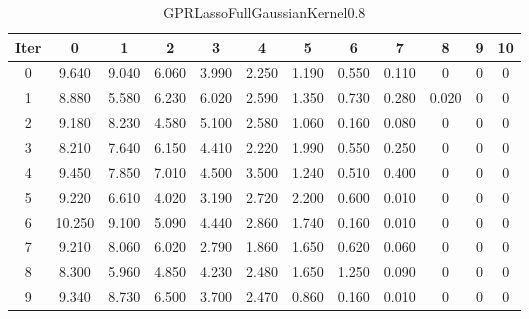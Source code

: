 \begin{table}
	\begin{center}
		\begin{tabular}{|c|c|c|c|c|c|c|c|c|c|c|c|}
			\hline
			Iter & 0 & 1 & 2 & 3 & 4 & 5 & 6 & 7 & 8 & 9 & 10 \\
			\hline
			0 & 9.640 & 9.040 & 6.060 & 3.990 & 2.250 & 1.190 & 0.550 & 0.110 & 0 & 0 & 0 \\
			\hline
			1 & 8.880 & 5.580 & 6.230 & 6.020 & 2.590 & 1.350 & 0.730 & 0.280 & 0.020 & 0 & 0 \\
			\hline
			2 & 9.180 & 8.230 & 4.580 & 5.100 & 2.580 & 1.060 & 0.160 & 0.080 & 0 & 0 & 0 \\
			\hline
			3 & 8.210 & 7.640 & 6.150 & 4.410 & 2.220 & 1.990 & 0.550 & 0.250 & 0 & 0 & 0 \\
			\hline
			4 & 9.450 & 7.850 & 7.010 & 4.500 & 3.500 & 1.240 & 0.510 & 0.400 & 0 & 0 & 0 \\
			\hline
			5 & 9.220 & 6.610 & 4.020 & 3.190 & 2.720 & 2.200 & 0.600 & 0.010 & 0 & 0 & 0 \\
			\hline
			6 & 10.250 & 9.100 & 5.090 & 4.440 & 2.860 & 1.740 & 0.160 & 0.010 & 0 & 0 & 0 \\
			\hline
			7 & 9.210 & 8.060 & 6.020 & 2.790 & 1.860 & 1.650 & 0.620 & 0.060 & 0 & 0 & 0 \\
			\hline
			8 & 8.300 & 5.960 & 4.850 & 4.230 & 2.480 & 1.650 & 1.250 & 0.090 & 0 & 0 & 0 \\
			\hline
			9 & 9.340 & 8.730 & 6.500 & 3.700 & 2.470 & 0.860 & 0.160 & 0.010 & 0 & 0 & 0 \\
			\hline
		\end{tabular}
	\end{center}
	\caption{GPRLassoFullGaussianKernel0.8}
\end{table}
